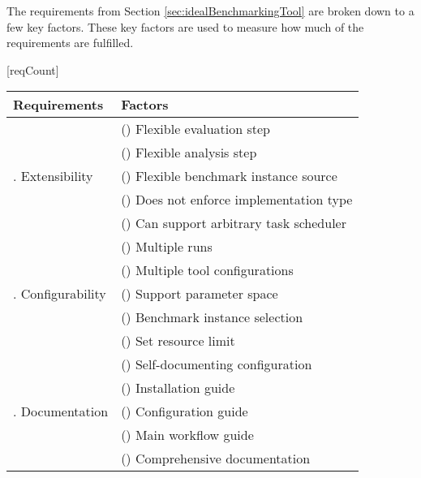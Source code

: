 The requirements from Section \ref{sec:idealBenchmarkingTool} are broken down to a few key factors.
These key factors are used to measure how much of the requirements are fulfilled.

[reqCount]
\newcommand{\reqLabel}[1]{
	\setcounter{reqFactorCount}{0}
	\addtocounter{reqCount}{1}
	\arabic{reqCount}.
	#1
}
\newcommand{\reqFactor}[1]{
	\addtocounter{reqFactorCount}{1}
	(\alph{reqFactorCount}) #1
}

\begin{table}
	\begin{threeparttable}
		\begin{tabular}{ll}

			\textbf{Requirements} & \textbf{Factors} \\

			\toprule




			\multirow{5}{*}{\reqLabel{Extensibility}}
				& \reqFactor{Flexible evaluation step} \\*
				& \reqFactor{Flexible analysis step} \\*
				& \reqFactor{Flexible benchmark instance source} \\*
				& \reqFactor{Does not enforce implementation type} \\*
				& \reqFactor{Can support arbitrary task scheduler} \\*
			\midrule

			\multirow{5}{*}{\reqLabel{Configurability}}
				& \reqFactor{Multiple runs} \\*
				& \reqFactor{Multiple tool configurations} \\*
				& \reqFactor{Support parameter space} \\*
				& \reqFactor{Benchmark instance selection} \\*
				& \reqFactor{Set resource limit} \\*
			\midrule

			\multirow{5}{*}{\reqLabel{Documentation}}
				& \reqFactor{Self-documenting configuration} \\*
				& \reqFactor{Installation guide} \\*
				& \reqFactor{Configuration guide} \\*
				& \reqFactor{Main workflow guide} \\*
				& \reqFactor{Comprehensive documentation\tnote{$\alpha$}} \\*
			\midrule


\end{tabular}
\end{threeparttable}
\end{table}
